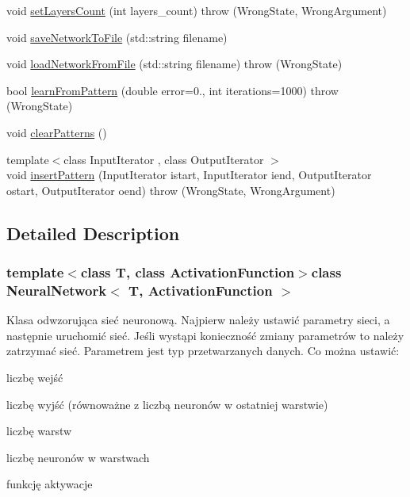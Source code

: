 \begin{DoxyCompactItemize}
\item 
void \hyperlink{class_neural_network_a3ef0490ade6f9efff49501132a12fd18}{set\-Layers\-Count} (int layers\-\_\-count)  throw (\-Wrong\-State, Wrong\-Argument)
\item 
void \hyperlink{class_neural_network_a60951fc1503702d98c67fa5bf10e0a7e}{save\-Network\-To\-File} (std\-::string filename)
\item 
void \hyperlink{class_neural_network_a5270bf5e7f7fc4c9fee4c5b609af32d0}{load\-Network\-From\-File} (std\-::string filename)  throw (\-Wrong\-State)
\item 
bool \hyperlink{class_neural_network_a04cb815d8040fee18909dbb81c6d189c}{learn\-From\-Pattern} (double error=0., int iterations=1000)  throw (\-Wrong\-State)
\item 
void \hyperlink{class_neural_network_ae6fcd0f55579ecf6ea9b67b5611dfe44}{clear\-Patterns} ()
\item 
{\footnotesize template$<$class Input\-Iterator , class Output\-Iterator $>$ }\\void \hyperlink{class_neural_network_af3a6f63b2a22719f7b5dd7e6c6abc45a}{insert\-Pattern} (\-Input\-Iterator istart, \-Input\-Iterator iend, \-Output\-Iterator ostart, \-Output\-Iterator oend)  throw (\-Wrong\-State, Wrong\-Argument)
\end{DoxyCompactItemize}


\subsection{\-Detailed \-Description}
\subsubsection*{template$<$class T, class Activation\-Function$>$class Neural\-Network$<$ T, Activation\-Function $>$}

\-Klasa odwzorująca sieć neuronową. \-Najpierw należy ustawić parametry sieci, a następnie uruchomić sieć. \-Jeśli wystąpi konieczność zmiany parametrów to należy zatrzymać sieć. \-Parametrem jest typ przetwarzanych danych. \-Co można ustawić\-: 
\begin{DoxyItemize}
\item liczbę wejść 
\item liczbę wyjść (równoważne z liczbą neuronów w ostatniej warstwie) 
\item liczbę warstw 
\item liczbę neuronów w warstwach 
\item funkcję aktywacje 
\end{DoxyItemize}

